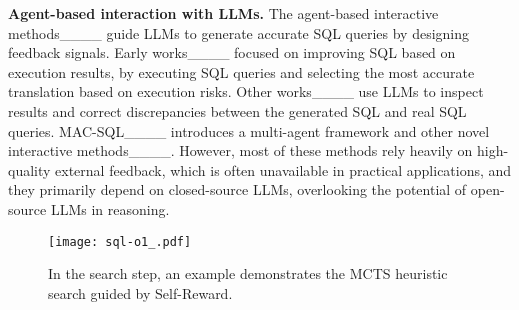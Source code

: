 \noindent \textbf{Agent-based interaction with LLMs.}
The agent-based interactive methods____ guide LLMs to generate accurate SQL queries by designing feedback signals. Early works____ focused on improving SQL based on execution results, by executing SQL queries and selecting the most accurate translation based on execution risks. Other works____ use LLMs to inspect results and correct discrepancies between the generated SQL and real SQL queries. MAC-SQL____ introduces a multi-agent framework and other novel interactive methods____. However, most of these methods rely heavily on high-quality external feedback, which is often unavailable in practical applications, and they primarily depend on closed-source LLMs, overlooking the potential of open-source LLMs in reasoning.


\begin{figure*}[bht!]  %
    \centering
    \texttt{[image: sql-o1\_.pdf]}  %
    \caption{In the search step, an example demonstrates the MCTS heuristic search guided by Self-Reward.}
    \label{fig:sql-o1}
\end{figure*}



%